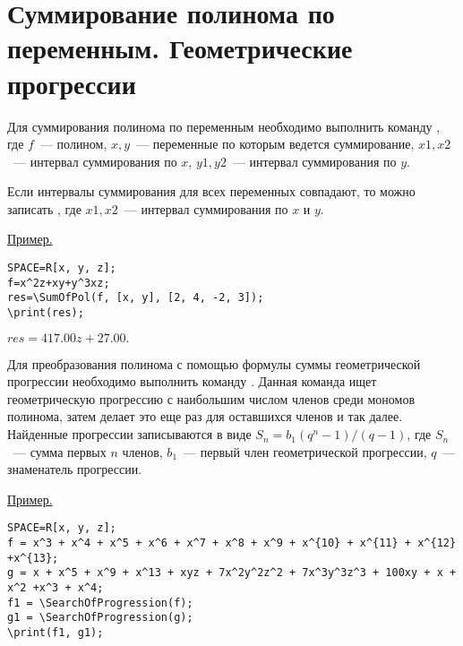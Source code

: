 
\section{Суммирование полинома по переменным.  Геометрические прогрессии }


Для суммирования полинома по переменным необходимо выполнить команду  
,  где
$f$~--- полином,  $x,  y$~--- переменные по которым ведется суммирование,  
$x1,  x2$~--- интервал суммирования по $x$,  
$y1,  y2$~--- интервал суммирования по $y$. 


Если интервалы суммирования для всех переменных совпадают, то можно записать  
,  где 
$x1,  x2$~--- интервал суммирования по $x$ и $y$. 

\underline{Пример.}

\vspace*{-2mm}
\begin{verbatim}
SPACE=R[x, y, z];
f=x^2z+xy+y^3xz;
res=\SumOfPol(f, [x, y], [2, 4, -2, 3]);
\print(res);
\end{verbatim}

{$res = 417. 00z+27. 00.$}
 
Для преобразования полинома с помощью формулы суммы геометрической прогрессии необходимо выполнить команду  
. 
Данная команда ищет геометрическую прогрессию с наибольшим числом членов среди мономов полинома, затем делает это еще раз для оставшихся членов и так далее. Найденные прогрессии записываются в виде $S_n=b_1(q^n-1)/(q-1)$,  где 
$S_n$~--- сумма первых $n$ членов,  $b_1$~--- первый член геометрической прогрессии,  $q$~--- знаменатель прогрессии. 

\underline{Пример. }

\vspace*{-2mm}
\begin{verbatim}
SPACE=R[x, y, z];
f = x^3 + x^4 + x^5 + x^6 + x^7 + x^8 + x^9 + x^{10} + x^{11} + x^{12} +x^{13};
g = x + x^5 + x^9 + x^13 + xyz + 7x^2y^2z^2 + 7x^3y^3z^3 + 100xy + x + x^2 +x^3 + x^4;
f1 = \SearchOfProgression(f);
g1 = \SearchOfProgression(g);
\print(f1, g1);
\end{verbatim}

